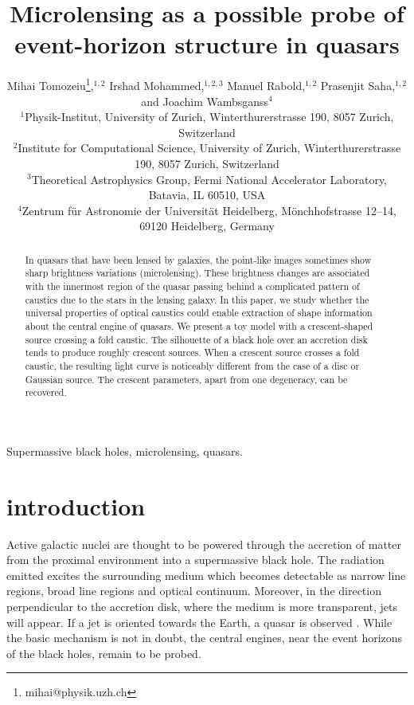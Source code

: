\documentclass[usenatbib]{mn2e}
\title{Microlensing as a possible probe of event-horizon structure in quasars}
\author[Tomozeiu et al]{Mihai Tomozeiu\thanks{mihai@physik.uzh.ch},$^{1,2}$ 
Irshad Mohammed,$^{1,2,3}$ 
Manuel Rabold,$^{1,2}$
Prasenjit Saha,$^{1,2}$  
\newauthor
and Joachim Wambsganss$^4$\\
$^1${Physik-Institut, University of Zurich, Winterthurerstrasse 190,
  8057 Zurich, Switzerland} \\
$^2${Institute for Computational Science, University of Zurich,
  Winterthurerstrasse 190, 8057 Zurich, Switzerland} \\
$^3${Theoretical Astrophysics Group, Fermi National Accelerator Laboratory, Batavia, IL 60510, USA}\\
$^4${Zentrum f\"ur Astronomie der Universit\"at Heidelberg,
  M\"onchhofstrasse 12--14, 69120 Heidelberg, Germany}
}
\begin{document}
\maketitle

\begin{abstract}

In quasars that have been lensed by galaxies, the point-like images
sometimes show sharp brightness variations (microlensing).  These
brightness changes are associated with the innermost region of the
quasar passing behind a complicated pattern of caustics due to the
stars in the lensing galaxy.  In this paper, we study whether the
universal properties of optical caustics could enable extraction of
shape information about the central engine of quasars.  We present a
toy model with a crescent-shaped source crossing a fold caustic.  The
silhouette of a black hole over an accretion disk tends to produce
roughly crescent sources.  When a crescent source crosses a fold
caustic, the resulting light curve is noticeably different from the
case of a disc or Gaussian source.  The crescent parameters, apart
from one degeneracy, can be recovered.
\end{abstract}


\begin{keywords}
Supermassive black holes, microlensing, quasars.
\end{keywords}

\section{introduction}

Active galactic nuclei are thought to be powered through the
accretion of matter from the proximal environment into a supermassive
black hole.  The radiation emitted excites the surrounding medium
which becomes detectable as narrow line regions, broad line regions
and optical continuum.  Moreover, in the direction perpendicular to
the accretion disk, where the medium is more transparent, jets will
appear.  If a jet is oriented towards the Earth, a quasar is observed
\citep[e.g.,][]{1984RvMP...56..255B}.  While the basic mechanism
\citep[originating in the work
  of][]{1964ApJ...140..796S,1964SPhD....9..246Z,1969Natur.223..690L}
is not in doubt, the central engines, near the event horizons of the
black holes, remain to be probed.
\end{document}
